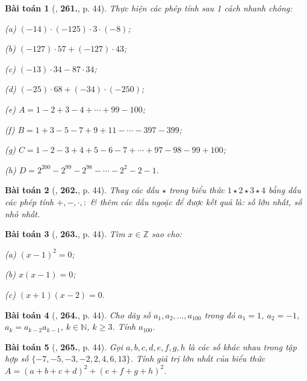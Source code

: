 \documentclass{article}
\numberwithin{equation}{section}
\newtheorem{baitoan}{Bài toán}
\begin{document}
\begin{baitoan}[\cite{Binh_Toan_6_tap_1}, \textbf{261.}, p. 44]
	Thực hiện các phép tính sau 1 cách nhanh chóng:
	\begin{enumerate*}
		\item[(a)] $(-14)\cdot(-125)\cdot3\cdot(-8)$;
		\item[(b)] $(-127)\cdot57 + (-127)\cdot43$;
		\item[(c)] $(-13)\cdot34 - 87\cdot34$;
		\item[(d)] $(-25)\cdot68 + (-34)\cdot(-250)$;
		\item[(e)] $A = 1 - 2 + 3 - 4 + \cdots + 99 - 100$;
		\item[(f)] $B = 1 + 3 - 5 - 7 + 9 + 11 - \cdots - 397 - 399$;
		\item[(g)] $C = 1 - 2 - 3 + 4 + 5 - 6 - 7 + \cdots + 97 - 98 - 99 + 100$;
		\item[(h)] $D = 2^{200} - 2^{99} - 2^{98} - \cdots - 2^2 - 2 - 1$.
	\end{enumerate*}
\end{baitoan}

\begin{baitoan}[\cite{Binh_Toan_6_tap_1}, \textbf{262.}, p. 44]
	Thay các dấu  $\star$ trong biểu thức $1\star2\star3\star4$ bằng dấu các phép tính $+,-,\cdot,:$ \& thêm các dấu ngoặc để được kết quả là: số lớn nhất, số nhỏ nhất.
\end{baitoan}

\begin{baitoan}[\cite{Binh_Toan_6_tap_1}, \textbf{263.}, p. 44]
	Tìm $x\in\mathbb{Z}$ sao cho:
	\begin{enumerate*}
		\item[(a)] $(x - 1)^2 = 0$;
		\item[(b)] $x(x - 1) = 0$;
		\item[(c)] $(x + 1)(x - 2) = 0$.
	\end{enumerate*}
\end{baitoan}

\begin{baitoan}[\cite{Binh_Toan_6_tap_1}, \textbf{264.}, p. 44]
	Cho dãy số $a_1,a_2,\ldots,a_{100}$ trong đó $a_1 = 1$, $a_2 = -1$, $a_k = a_{k-2}a_{k-1}$, $k\in\mathbb{N}$, $k\ge 3$. Tính $a_{100}$.
\end{baitoan}

\begin{baitoan}[\cite{Binh_Toan_6_tap_1}, \textbf{265.}, p. 44]
	Gọi $a,b,c,d,e,f,g,h$ là các số khác nhau trong tập hợp số $\{-7,-5,-3,-2,2,4,6,13\}$. Tính giá trị lớn nhất của biểu thức $A = (a + b + c + d)^2 + (e + f + g + h)^2$.
\end{baitoan}
\end{document}
